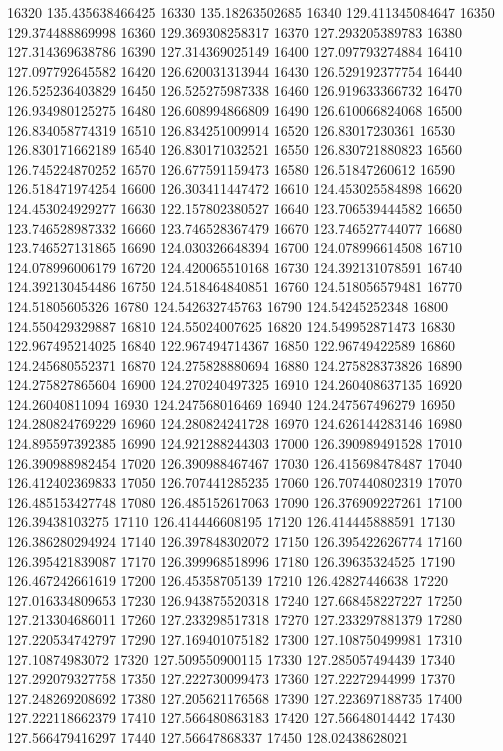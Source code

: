 {16320 135.435638466425
16330 135.18263502685
16340 129.411345084647
16350 129.374488869998
16360 129.369308258317
16370 127.293205389783
16380 127.314369638786
16390 127.314369025149
16400 127.097793274884
16410 127.097792645582
16420 126.620031313944
16430 126.529192377754
16440 126.525236403829
16450 126.525275987338
16460 126.919633366732
16470 126.934980125275
16480 126.608994866809
16490 126.610066824068
16500 126.834058774319
16510 126.834251009914
16520 126.83017230361
16530 126.830171662189
16540 126.830171032521
16550 126.830721880823
16560 126.745224870252
16570 126.677591159473
16580 126.51847260612
16590 126.518471974254
16600 126.303411447472
16610 124.453025584898
16620 124.453024929277
16630 122.157802380527
16640 123.706539444582
16650 123.746528987332
16660 123.746528367479
16670 123.746527744077
16680 123.746527131865
16690 124.030326648394
16700 124.078996614508
16710 124.078996006179
16720 124.420065510168
16730 124.392131078591
16740 124.392130454486
16750 124.518464840851
16760 124.518056579481
16770 124.51805605326
16780 124.542632745763
16790 124.54245252348
16800 124.550429329887
16810 124.55024007625
16820 124.549952871473
16830 122.967495214025
16840 122.967494714367
16850 122.96749422589
16860 124.245680552371
16870 124.275828880694
16880 124.275828373826
16890 124.275827865604
16900 124.270240497325
16910 124.260408637135
16920 124.26040811094
16930 124.247568016469
16940 124.247567496279
16950 124.280824769229
16960 124.280824241728
16970 124.626144283146
16980 124.895597392385
16990 124.921288244303
17000 126.390989491528
17010 126.390988982454
17020 126.390988467467
17030 126.415698478487
17040 126.412402369833
17050 126.707441285235
17060 126.707440802319
17070 126.485153427748
17080 126.485152617063
17090 126.376909227261
17100 126.39438103275
17110 126.414446608195
17120 126.414445888591
17130 126.386280294924
17140 126.397848302072
17150 126.395422626774
17160 126.395421839087
17170 126.399968518996
17180 126.39635324525
17190 126.467242661619
17200 126.45358705139
17210 126.42827446638
17220 127.016334809653
17230 126.943875520318
17240 127.668458227227
17250 127.213304686011
17260 127.233298517318
17270 127.233297881379
17280 127.220534742797
17290 127.169401075182
17300 127.108750499981
17310 127.10874983072
17320 127.509550900115
17330 127.285057494439
17340 127.292079327758
17350 127.222730099473
17360 127.22272944999
17370 127.248269208692
17380 127.205621176568
17390 127.223697188735
17400 127.222118662379
17410 127.566480863183
17420 127.56648014442
17430 127.566479416297
17440 127.56647868337
17450 128.02438628021
}
